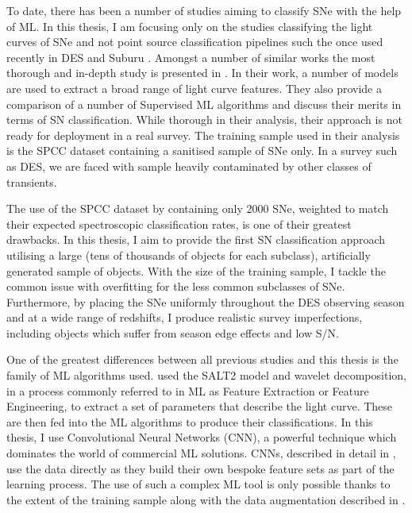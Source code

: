 To date, there has been a number of studies aiming to classify SNe with the help of ML. In this thesis, I am focusing only on the studies classifying the light curves of SNe and not point source classification pipelines such the once used recently in DES \citep{Goldstein2015} and Suburu \citep{Morii2014}. Amongst a number of similar works \citep{Karpenka2012,Moller2016,Charnock2016} the most thorough and in-depth study is presented in \citet{Lochner2016}. In their work, a number of models are used to extract a broad range of light curve features. They also provide a comparison of a number of Supervised ML algorithms and discuss their merits in terms of SN classification. While thorough in their analysis, their approach is not ready for deployment in a real survey. The training sample used in their analysis is the SPCC dataset containing a sanitised sample of SNe only. In a survey such as DES, we are faced with sample heavily contaminated by other classes of transients.

The use of the SPCC dataset by \citet{Lochner2016} containing only 2000 SNe, weighted to match their expected spectroscopic classification rates, is one of their greatest drawbacks. In this thesis, I aim to provide the first SN classification approach utilising a large (tens of thousands of objects for each subclass), artificially generated sample of objects. With the size of the training sample, I tackle the common issue with overfitting for the less common subclasses of SNe. Furthermore, by placing the SNe uniformly throughout the DES observing season and at a wide range of redshifts, I produce realistic survey imperfections, including objects which suffer from season edge effects and low S/N.

One of the greatest differences between all previous studies and this thesis is the family of ML algorithms used. \citet{Lochner2016} used the SALT2 model and wavelet decomposition, in a process commonly referred to in ML as Feature Extraction or Feature Engineering, to extract a set of parameters that describe the light curve. These are then fed into the ML algorithms to produce their classifications. In this thesis, I use Convolutional Neural Networks (CNN), a powerful technique which dominates the world of commercial ML solutions. CNNs, described in detail in , use the data directly as they build their own bespoke feature sets as part of the learning process. The use of such a complex ML tool is only possible thanks to the extent of the training sample along with the data augmentation described in .

